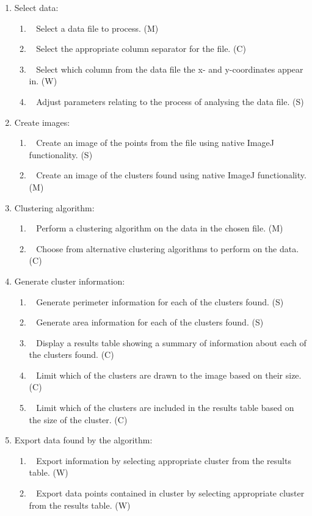 \begin{enumerate}[label=\arabic*.]
	\item Select data:
		\begin{enumerate}[label*=\arabic*.]
			\item~\label{req:a} Select a data file to process. (M)
			\item~\label{req:b} Select the appropriate column separator for the
				file. (C)
			\item~\label{req:c} Select which column from the data file the x-
				and y-coordinates appear in. (W)
			\item~\label{req:d} Adjust parameters relating to the process of
				analysing the data file. (S)
		\end{enumerate}
	\item Create images:
		\begin{enumerate}[label*=\arabic*.]
			\item~\label{req:e} Create an image of the points from the file
				using native ImageJ functionality. (S)
			\item~\label{req:f} Create an image of the clusters found using
				native ImageJ functionality. (M)
		\end{enumerate}
	\item Clustering algorithm:
		\begin{enumerate}
			\item~\label{req:g} Perform a clustering algorithm on the data in
				the chosen file. (M)
			\item~\label{req:qa} Choose from alternative clustering algorithms
				to perform on the data. (C)
		\end{enumerate}
	\item Generate cluster information:
		\begin{enumerate}[label*=\arabic*.]
			\item~\label{req:h} Generate perimeter information for each of the
				clusters found. (S)
			\item~\label{req:i} Generate area information for each of the
				clusters found. (S)
			\item~\label{req:j} Display a results table showing a summary of
				information about each of the clusters found. (C)
			\item~\label{req:k} Limit which of the clusters are drawn to the
				image based on their size. (C)
			\item~\label{req:l} Limit which of the clusters are included in the
				results table based on the size of the cluster. (C)
		\end{enumerate}
	\item Export data found by the algorithm:
		\begin{enumerate}[label*=\arabic*.]
			\item~\label{req:m} Export information by selecting appropriate
				cluster from the results table. (W)
			\item~\label{req:n} Export data points contained in cluster by
				selecting appropriate cluster from the results table. (W)
		\end{enumerate}
\end{enumerate}

